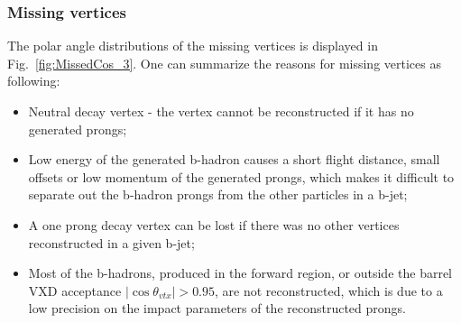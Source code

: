 \subsubsection{Missing vertices}
\label{sec:MisVertices}


The polar angle distributions of the missing vertices is displayed in Fig.~\ref{fig:MissedCos_3}. 
One can summarize the reasons for missing vertices as following: 
\begin{itemize}
\item Neutral decay vertex - the vertex cannot be reconstructed if it has no generated prongs;
\item Low energy of the generated b-hadron causes a short flight distance, small offsets or low momentum of the generated prongs, which makes it difficult to separate out the b-hadron prongs from the other particles in a b-jet;
\item A one prong decay vertex can be lost if there was no other vertices reconstructed in a given b-jet;
\item Most of the b-hadrons, produced in the forward region, or outside the barrel VXD acceptance $|\cos\theta_{vtx}| > 0.95$, are not reconstructed, which is due to a low precision on the impact parameters of the reconstructed prongs. 
\end{itemize}

